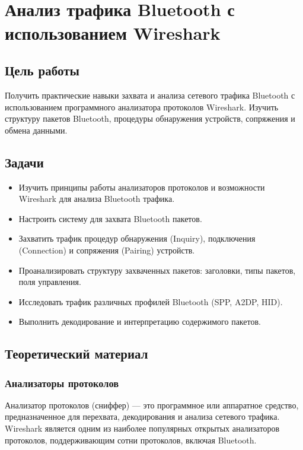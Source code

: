 \section[Анализ трафика Bluetooth с использованием Wireshark]
{\\Анализ трафика Bluetooth с использованием Wireshark}

\subsection{Цель работы}
Получить практические навыки захвата и анализа сетевого трафика Bluetooth с использованием программного анализатора протоколов Wireshark. Изучить структуру пакетов Bluetooth, процедуры обнаружения устройств, сопряжения и обмена данными.

\subsection{Задачи}
\begin{itemize}[nosep]
    \item Изучить принципы работы анализаторов протоколов и возможности Wireshark для анализа Bluetooth трафика.
    \item Настроить систему для захвата Bluetooth пакетов.
    \item Захватить трафик процедур обнаружения (Inquiry), подключения (Connection) и сопряжения (Pairing) устройств.
    \item Проанализировать структуру захваченных пакетов: заголовки, типы пакетов, поля управления.
    \item Исследовать трафик различных профилей Bluetooth (SPP, A2DP, HID).
    \item Выполнить декодирование и интерпретацию содержимого пакетов.
\end{itemize}

\subsection{Теоретический материал}

\subsubsection{Анализаторы протоколов}
Анализатор протоколов (сниффер) — это программное или аппаратное средство, предназначенное для перехвата, декодирования и анализа сетевого трафика. Wireshark является одним из наиболее популярных открытых анализаторов протоколов, поддерживающим сотни протоколов, включая Bluetooth.

